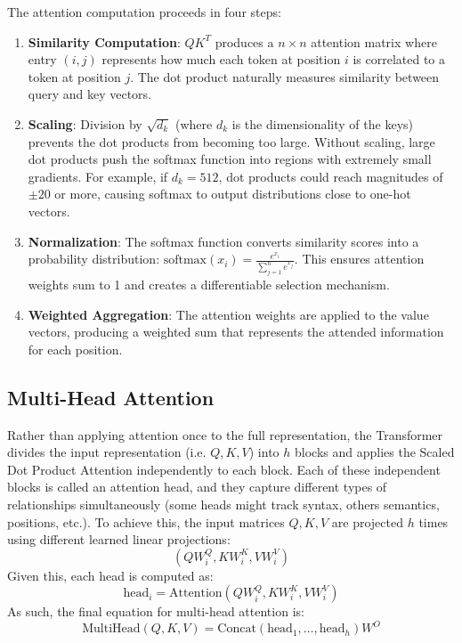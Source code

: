 The attention computation proceeds in four steps:

\begin{enumerate}
   \item \textbf{Similarity Computation}: $QK^T$ produces a $n \times n$ attention matrix where entry $(i,j)$ represents how much each token at position $i$ is correlated to a token at position $j$. The dot product naturally measures similarity between query and key vectors.

   \item \textbf{Scaling}: Division by $\sqrt{d_k}$ (where $d_k$ is the dimensionality of the keys) prevents the dot products from becoming too large. Without scaling, large dot products push the softmax function into regions with extremely small gradients. For example, if $d_k = 512$, dot products could reach magnitudes of $\pm 20$ or more, causing softmax to output distributions close to one-hot vectors.

   \item \textbf{Normalization}: The softmax function converts similarity scores into a probability distribution: $\text{softmax}(x_i) = \frac{e^{x_i}}{\sum_{j=1}^n e^{x_j}}$. This ensures attention weights sum to 1 and creates a differentiable selection mechanism.

   \item \textbf{Weighted Aggregation}: The attention weights are applied to the value vectors, producing a weighted sum that represents the attended information for each position.
\end{enumerate}

\subsection{Multi-Head Attention}

Rather than applying attention once to the full representation, the Transformer divides the input representation (i.e. $Q, K, V$) into $h$ blocks and applies the Scaled Dot Product Attention independently to each block. Each of these independent blocks is called an attention head, and they capture different types of relationships simultaneously (some heads might track syntax, others semantics, positions, etc.). To achieve this, the input matrices $Q, K, V$ are projected $h$ times using different learned linear projections:
\begin{equation}
(QW_i^Q, KW_i^K, VW_i^V)
\end{equation}
Given this, each head is computed as:
\begin{equation}
\text{head}_i = \text{Attention}(QW_i^Q, KW_i^K, VW_i^V)
\end{equation}
As such, the final equation for multi-head attention is:
\begin{equation}
\text{MultiHead}(Q, K, V) = \text{Concat}(\text{head}_1, \ldots, \text{head}_h)W^O
\end{equation}

